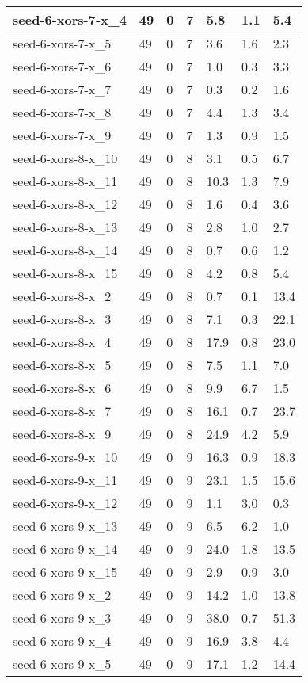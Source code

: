 \begin{scriptsize}
\begin{longtable}{|p{5cm}|l|l|l|l|l|l|}
seed-6-xors-7-x\_4&49&0&7&5.8&1.1&5.4 \\ \hline 
seed-6-xors-7-x\_5&49&0&7&3.6&1.6&2.3 \\ \hline 
seed-6-xors-7-x\_6&49&0&7&1.0&0.3&3.3 \\ \hline 
seed-6-xors-7-x\_7&49&0&7&0.3&0.2&1.6 \\ \hline 
seed-6-xors-7-x\_8&49&0&7&4.4&1.3&3.4 \\ \hline 
seed-6-xors-7-x\_9&49&0&7&1.3&0.9&1.5 \\ \hline 
seed-6-xors-8-x\_10&49&0&8&3.1&0.5&6.7 \\ \hline 
seed-6-xors-8-x\_11&49&0&8&10.3&1.3&7.9 \\ \hline 
seed-6-xors-8-x\_12&49&0&8&1.6&0.4&3.6 \\ \hline 
seed-6-xors-8-x\_13&49&0&8&2.8&1.0&2.7 \\ \hline 
seed-6-xors-8-x\_14&49&0&8&0.7&0.6&1.2 \\ \hline 
seed-6-xors-8-x\_15&49&0&8&4.2&0.8&5.4 \\ \hline 
seed-6-xors-8-x\_2&49&0&8&0.7&0.1&13.4 \\ \hline 
seed-6-xors-8-x\_3&49&0&8&7.1&0.3&22.1 \\ \hline 
seed-6-xors-8-x\_4&49&0&8&17.9&0.8&23.0 \\ \hline 
seed-6-xors-8-x\_5&49&0&8&7.5&1.1&7.0 \\ \hline 
seed-6-xors-8-x\_6&49&0&8&9.9&6.7&1.5 \\ \hline 
seed-6-xors-8-x\_7&49&0&8&16.1&0.7&23.7 \\ \hline 
seed-6-xors-8-x\_9&49&0&8&24.9&4.2&5.9 \\ \hline 
seed-6-xors-9-x\_10&49&0&9&16.3&0.9&18.3 \\ \hline 
seed-6-xors-9-x\_11&49&0&9&23.1&1.5&15.6 \\ \hline 
seed-6-xors-9-x\_12&49&0&9&1.1&3.0&0.3 \\ \hline 
seed-6-xors-9-x\_13&49&0&9&6.5&6.2&1.0 \\ \hline 
seed-6-xors-9-x\_14&49&0&9&24.0&1.8&13.5 \\ \hline 
seed-6-xors-9-x\_15&49&0&9&2.9&0.9&3.0 \\ \hline 
seed-6-xors-9-x\_2&49&0&9&14.2&1.0&13.8 \\ \hline 
seed-6-xors-9-x\_3&49&0&9&38.0&0.7&51.3 \\ \hline 
seed-6-xors-9-x\_4&49&0&9&16.9&3.8&4.4 \\ \hline 
seed-6-xors-9-x\_5&49&0&9&17.1&1.2&14.4 \\ \hline 

\end{longtable}
\end{scriptsize}
